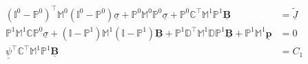 \documentclass[../master_thesis.tex]{subfiles}
\begin{document}
\begin{align*}
    (\mathbb{I}^0-\mathbb{P}^0)^\top \mathbb{M}^0 
        (\mathbb{I}^0-\mathbb{P}^0)\underline{\sigma} 
        +  \mathbb{P}^0 \mathbb{M}^0 \mathbb{P}^0 \underline{\sigma}
        +  \mathbb{P}^0 \mathbb{C} ^\top \mathbb{M}^1 \mathbb{P}^1 
        \underline{\mathbf{B}} &=  \underline{\tilde{J}} 
    \\ \mathbb{P}^1 \mathbb{M}^1 \mathbb{C} \mathbb{P}^0 \underline{\sigma}
        + (\mathbb{I}-\mathbb{P}^1) \mathbb{M}^1 
        (\mathbb{I}-\mathbb{P}^1)\underline{\mathbf{B}}
        + \mathbb{P}^1 \mathbb{D}^\top \mathbb{M}^1 
        \mathbb{D} \mathbb{P}^1 \underline{\mathbf{B}} + 
        \mathbb{P}^1 \mathbb{M}^1 \underline{\mathbf{p}} &= 0 
    \\ \underline{\psi}^\top \mathbb{C}^\top \mathbb{M}^1 \mathbb{P}^1 \underline{\mathbf{B}} &= C_1
\end{align*}
\end{document}

